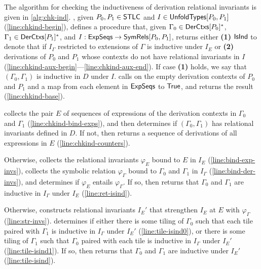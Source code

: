 %
The algorithm \chkinductive for checking the inductiveness of
derivation relational invariants is given in
\autoref{alg:chk-ind}.
%
\chkinductive, given $P_0, P_1 \in \mathsf{STLC}$ and $I \in
\mathsf{UnfoldTypes}[ P_0, P_1 ]$ (\autoref{line:chkind-begin}), defines a
procedure \chkindaux that, given $\Gamma_0 \in \mathsf{DerCtxs}[ P_0 ]^{*}$,
$\Gamma_1 \in \mathsf{DerCtxs}[ P_1 ]^{*}$, and $I: \mathsf{ExpSeqs} \to
\mathsf{SymRels}[ P_0, P_1 ]$, returns either %
\textbf{(1)} $\mathsf{IsInd}$ to denote that if $I_{\Gamma}$ restricted to
extensions of $\Gamma$ is inductive under $I_E$
%
%
or
%
%
\textbf{(2)} derivations of $P_0$ and $P_1$ whose contexts do not have
relational invariants in $I$
(\autoref{line:chkind-aux-begin}---\autoref{line:chkind-aux-end}).
%
If case \textbf{(1)} holds, we say that $(\Gamma_0, \Gamma_1)$ is
inductive in $D$ under $I$.
%
\chkinductive calls \chkindaux on the empty derivation contexts of
$P_0$ and $P_1$ and a map from each element in $\mathsf{ExpSeqs}$ to
$\mathsf{True}$, and returns the result (\autoref{line:chkind-base}).

\chkindaux collects the pair $E$ of sequences of expressions of the
derivation contexts in $\Gamma_0$ and $\Gamma_1$
(\autoref{line:chkind-bind-exps}), and then determines if $(\Gamma_0,
\Gamma_1)$ has relational invariants defined in $D$.
%
If not, then \chkindaux returns a sequence of derivations of all
expressions in $E$ (\autoref{line:chkind-counters}).

Otherwise, \chkindaux collects the relational invariants $\varphi_E$
bound to $E$ in $I_E$ (\autoref{line:bind-exp-invs}), %
collects the symbolic relation $\varphi_{\Gamma}$ bound to $\Gamma_0$
and $\Gamma_1$ in $I_{\Gamma}$ (\autoref{line:bind-der-invs}), and %
determines if $\varphi_E$ entails $\varphi_{\Gamma}$.
%
If so, then \chkindaux returns that $\Gamma_0$ and $\Gamma_1$ are
inductive in $I_{\Gamma}$ under $I_E$ (\autoref{line:ret-isind}).

Otherwise, \chkindaux constructs relational invariants $I_E'$ that
strengthen $I_E$ at $E$ with $\varphi_{\Gamma}$
(\autoref{line:str-invs}).
%
\chkindaux determines if either there is some tiling of $\Gamma_0$
such that each tile paired with $\Gamma_1$ is inductive in
$I_{\Gamma}$ under $I_E'$ (\autoref{line:tile-isind0}), or there is
some tiling of $\Gamma_1$ such that $\Gamma_0$ paired with each tile
is inductive in $I_{\Gamma}$ under $I_E'$ (\autoref{line:tile-isind1}).
%
If so, then \chkindaux returns that $\Gamma_0$ and $\Gamma_1$ are
inductive under $I_E'$ (\autoref{line:tile-isind}).


